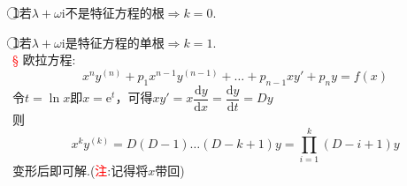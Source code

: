 \documentclass{article}
\begin{document}
	\textcircled{1}若$\lambda+\omega\mathrm{i}$不是特征方程的根$\Rightarrow k=0$.
	
	\textcircled{1}若$\lambda+\omega\mathrm{i}$是特征方程的单根$\Rightarrow k=1$.
	\\
	
	\noindent\textcolor{red}{\S} 欧拉方程:
	\[
		x^ny^{(n)}+p_1x^{n-1}y^{(n-1)}+\dots+p_{n-1}xy'+p_ny=f(x)	
	\]
	令$t=\ln x$即$x=\mathrm{e}^t$，可得$xy'=x\dfrac{\mathrm{d}y}{\mathrm{d}x}=\dfrac{\mathrm{d}y}{\mathrm{d}t}=Dy$\\
	则\[x^ky^{(k)}=D(D-1)\dots(D-k+1)y=\prod_{i=1}^{k}(D-i+1)y\]
	变形后即可解.(\textcolor{red}{注}:记得将$x$带回)
\end{document}
